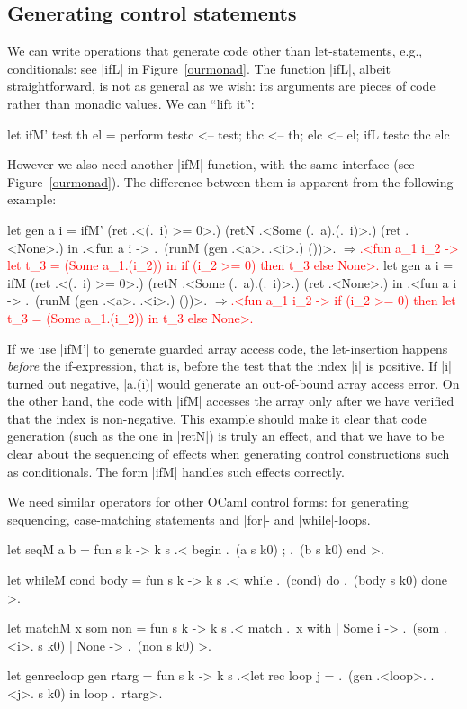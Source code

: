 \documentclass{elsart}
\newcommand{\evalresult}[1]{\ensuremath{\Longrightarrow}\textcolor{red}{#1}}
\begin{document}
\subsection{Generating control statements}\label{ssec:control}
We can write operations that generate code other than let-statements,
e.g., conditionals: see |ifL| in Figure~\ref{ourmonad}. The function |ifL|, 
albeit straightforward, is not as general as we wish: its arguments are
pieces of code rather than monadic values. We can ``lift it'':
\begin{code}
let ifM' test th el = perform
  testc <-- test; thc <-- th; elc <-- el;
  ifL testc thc elc
\end{code}
However we also need another |ifM| function, with the same
interface (see Figure~\ref{ourmonad}).
The difference between them is apparent from the following example:
\begin{code}[commandchars=\\\{\}]
let gen a i = ifM' (ret .<(.~i) >= 0>.) 
                   (retN .<Some (.~a).(.~i)>.) (ret .<None>.)
 in .<fun a i -> .~(runM (gen .<a>. .<i>.) ())>.
\evalresult{.<fun a_1 i_2 ->}
\textcolor{red}{      let t_3 = (Some a_1.(i_2)) in if (i_2 >= 0) then t_3 else None>.}
let gen a i = ifM (ret .<(.~i) >= 0>.) 
                  (retN .<Some (.~a).(.~i)>.) (ret .<None>.)
 in .<fun a i -> .~(runM (gen .<a>. .<i>.) ())>.
\evalresult{.<fun a_1 i_2 ->}
\textcolor{red}{      if (i_2 >= 0) then let t_3 = (Some a_1.(i_2)) in t_3 else None>.}
\end{code}
%
If we use |ifM'| to generate guarded array access code, the let-insertion
happens \emph{before} the if-expression, that is, before the test that
the index |i| is positive. If |i| turned out
negative, |a.(i)| would generate an out-of-bound array access
error. On the other hand, the code with |ifM| accesses the array only
after we have verified that the index is non-negative. This example
should make it clear that code generation (such as the one in |retN|) is 
truly an effect, and that we have to be clear about the sequencing of
effects when generating control constructions such as conditionals.
The form |ifM| handles such effects correctly. 

We need similar operators for other OCaml control forms: for
generating sequencing, case-matching statements and |for|- and |while|-loops.
\begin{code}
let seqM a b = fun s k -> 
  k s .< begin .~(a s k0) ; .~(b s k0) end >.

let whileM cond body = fun s k -> 
  k s .< while .~(cond) do .~(body s k0) done >.

let matchM x som non = fun s k -> k s .< match .~x with
           | Some i -> .~(som .<i>. s k0)
           | None   -> .~(non s k0) >.

let genrecloop gen rtarg = fun s k -> 
  k s .<let rec loop j = .~(gen .<loop>. .<j>. s k0) in loop .~rtarg>.
\end{code}
\end{document}
